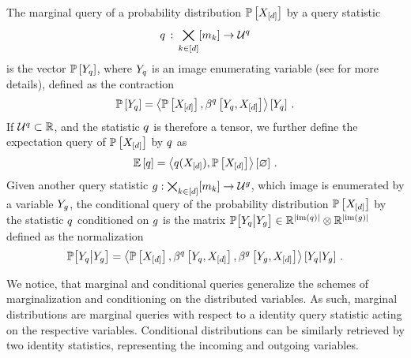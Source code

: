 \begin{definition}
    \label{def:queries}
    The marginal query of a probability distribution $\mathbb{P}\left[X_{[d]}\right]$ by a query statistic
    \begin{align*}
        q \,:\, \bigtimes_{k\in[d]}[m_{k}] \rightarrow \mathcal{U}^{q}
    \end{align*}
    is the vector $\mathbb{P}\left[Y_{q}\right]$, where $Y_{q}$ is an image enumerating variable (see  for more details), defined as the contraction
    \begin{align*}
        \mathbb{P}\left[Y_{q}\right]
        = \left\langle \mathbb{P}\left[X_{[d]}\right],\beta^{q}\left[Y_{q},X_{[d]}\right]\right\rangle \left[ Y_{q} \right] \, .
    \end{align*}
    If $\mathcal{U}^{q}\subset\mathbb{R}$, and the statistic $q$ is therefore a tensor, we further define the expectation query of $\mathbb{P}\left[X_{[d]}\right]$ by $q$ as
    \begin{align*}
        \mathbb{E}\left[q\right] = \left\langle q(X_{[d]}),\mathbb{P}\left[X_{[d]}\right]\right\rangle \left[ \varnothing \right] \, .
    \end{align*}
    Given another query statistic $g: \bigtimes_{k\in[d]}[m_{k}] \rightarrow \mathcal{U}^{g}$, which image is enumerated by a variable $Y_{g}$, the conditional query of the probability distribution $\mathbb{P}\left[X_{[d]}\right]$ by the statistic $q$ conditioned on $g$ is the matrix $\mathbb{P}\big[Y_{q}\big|Y_{g}\big]\in\mathbb{R}^{\left|\mathrm{im}\left(q\right)\right|}\otimes \mathbb{R}^{\left|\mathrm{im}\left(g\right)\right|}$ defined as the normalization
    \begin{align*}
        \mathbb{P}\big[Y_{q}\big|Y_{g}\big]
        = \left\langle 
            \mathbb{P}\left[X_{[d]}\right],\beta^{q}\left[Y_{q},X_{[d]}\right],\beta^{g}\left[Y_{g},X_{[d]}\right]
        \right\rangle \left[ 
            Y_{q} | Y_{g}
         \right] \, .
    \end{align*}
\end{definition}

We notice, that marginal and conditional queries generalize the schemes of marginalization and conditioning on the distributed variables.
As such, marginal distributions are marginal queries with respect to a identity query statistic acting on the respective variables.
Conditional distributions can be similarly retrieved by two identity statistics, representing the incoming and outgoing variables.

